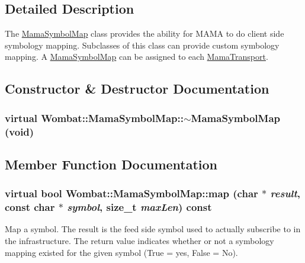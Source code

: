 \subsection{Detailed Description}
The \hyperlink{classWombat_1_1MamaSymbolMap}{MamaSymbolMap} class provides the ability for MAMA to do client side symbology mapping. Subclasses of this class can provide custom symbology mapping. A \hyperlink{classWombat_1_1MamaSymbolMap}{MamaSymbolMap} can be assigned to each \hyperlink{classWombat_1_1MamaTransport}{MamaTransport}. 

\subsection{Constructor \& Destructor Documentation}
\hypertarget{classWombat_1_1MamaSymbolMap_a6305c760bf88c60104dfaf11fb39113e}{
\subsubsection[{$\sim$MamaSymbolMap}]{\setlength{\rightskip}{0pt plus 5cm}virtual Wombat::MamaSymbolMap::$\sim$MamaSymbolMap (void)}}
\label{classWombat_1_1MamaSymbolMap_a6305c760bf88c60104dfaf11fb39113e}


\subsection{Member Function Documentation}
\hypertarget{classWombat_1_1MamaSymbolMap_a2e4d030ecbca9255a90c7f1d157800ef}{
\subsubsection[{map}]{\setlength{\rightskip}{0pt plus 5cm}virtual bool Wombat::MamaSymbolMap::map (char $\ast$ {\em result}, \/  const char $\ast$ {\em symbol}, \/  size\_\-t {\em maxLen}) const}}
\label{classWombat_1_1MamaSymbolMap_a2e4d030ecbca9255a90c7f1d157800ef}


Map a symbol. The result is the feed side symbol used to actually subscribe to in the infrastructure. The return value indicates whether or not a symbology mapping existed for the given symbol (True = yes, False = No). 

